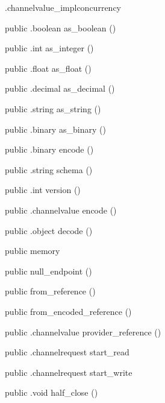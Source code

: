 \begin{CrexxClass}{.channelvalue\_impl}{concurrency}
\begin{Members}
    \Method
      {public}
      {.boolean}
      {as\_boolean}
      {()}

    \Method
      {public}
      {.int}
      {as\_integer}
      {()}

    \Method
      {public}
      {.float}
      {as\_float}
      {()}

    \Method
      {public}
      {.decimal}
      {as\_decimal}
      {()}

    \Method
      {public}
      {.string}
      {as\_string}
      {()}

    \Method
      {public}
      {.binary}
      {as\_binary}
      {()}

    \Method
      {public}
      {.binary}
      {encode}
      {()}

    \Method
      {public}
      {.string}
      {schema}
      {()}

    \Method
      {public}
      {.int}
      {version}
      {()}

    \Method
      {public}
      {.channelvalue}
      {encode}
      {()}

    \Method
      {public}
      {.object}
      {decode}
      {()}

    \Factory
      {public}
      {memory}
      {}

    \Factory
      {public}
      {null\_endpoint}
      {()}

    \Factory
      {public}
      {from\_reference}
      {()}

    \Factory
      {public}
      {from\_encoded\_reference}
      {()}

    \Method
      {public}
      {.channelvalue}
      {provider\_reference}
      {()}

    \Method
      {public}
      {.channelrequest}
      {start\_read}
      {}

    \Method
      {public}
      {.channelrequest}
      {start\_write}
      {}

    \Method
      {public}
      {.void}
      {half\_close}
      {()}


\end{Members}
\end{CrexxClass}
